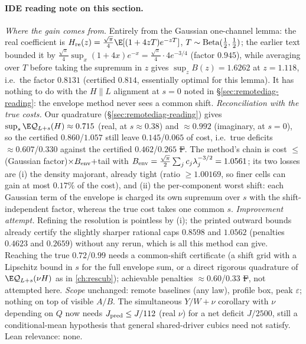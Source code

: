\paragraph{IDE reading note on this section.} \emph{Where the gain comes from.} Entirely from the Gaussian one-channel lemma: the real coefficient is $H_{\rm re}(z)=\frac{\sqrt\pi}4\E[(1+4zT)e^{-zT}]$,
$T\sim{\rm Beta}(\frac12,\frac12)$; the earlier text bounded it by $\frac{\sqrt\pi}4\sup_x(1+4x)e^{-x}=\frac{\sqrt\pi}4\cdot4e^{-3/4}$ (factor $0.945$), while averaging over $T$ before taking the supremum in
$z$ gives $\sup_zB(z)=1.6262$ at $z=1.118$, i.e.\ the factor $0.8131$ (certified $0.814$, essentially optimal for this lemma). It has nothing to do with the $H\parallel L$ alignment at $s=0$ noted in
\S\ref{sec:remotediag-reading}: the envelope method never sees a common shift. \emph{Reconciliation with the true costs.} Our quadrature (\S\ref{sec:remotediag-reading}) gives
$\sup_s\E\mathcal Q_{L+s}(H)\approx0.715$ (real, at $s\approx0.38$) and $\approx0.992$ (imaginary, at $s=0$), so the certified $0.860$/$1.057$ still leave $0.145$/$0.065$ of cost, i.e.\ true deficits
$\approx0.607$/$0.330$ against the certified $0.462$/$0.265$ \st{F}. The method's chain is cost $\le$ (Gaussian factor)$\times B_{\rm env}+$tail with $B_{\rm env}=\frac{\sqrt\pi}2\sum_jc_j\lambda_j^{-3/2}=1.0561$;
its two losses are (i) the density majorant, already tight (ratio $\ge1.00169$, so finer cells can gain at most $0.17\%$ of the cost), and (ii) the per-component worst shift: each Gaussian term of the
envelope is charged its own supremum over $s$ with the shift-independent factor, whereas the true cost takes one common $s$. \emph{Improvement attempt.} Refining the resolution is pointless by (i);
the printed outward bounds already certify the slightly sharper rational caps $0.8598$ and $1.0562$ (penalties $0.4623$ and $0.2659$) without any rerun, which is all this method can give. Reaching the
true $0.72$/$0.99$ needs a common-shift certificate (a shift grid with a Lipschitz bound in $s$ for the full envelope sum, or a direct rigorous quadrature of $\E\mathcal Q_{L+s}(\nu H)$ as in
\autoref{ch:rescub}); achievable penalties $\approx0.60$/$0.33$ \st{F}, not attempted here. \emph{Scope} unchanged: remote baselines (any law), profile box, peak $\varepsilon$; nothing on top of
visible $A/B$. The simultaneous $Y/W+\nu$ corollary with $\nu$ depending on $Q$ now needs $J_{\rm pred}\le J/112$ (real $\nu$) for a net deficit $J/2500$, still a conditional-mean hypothesis that
general shared-driver cubics need not satisfy. Lean relevance: none.
